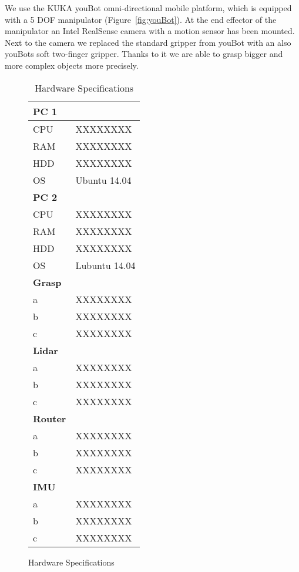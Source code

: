 We use the KUKA youBot omni-directional mobile platform, which is equipped with a 5 DOF manipulator (Figure~\ref{fig:youBot}). At the end effector of the manipulator an Intel RealSense camera with a motion sensor has been mounted. Next to the camera we replaced the standard gripper from youBot with an also youBots soft two-finger gripper. Thanks to it we are able to grasp bigger and more complex objects more precisely.

\begin{figure}[htbp]
	\begin{minipage}{0.45\textwidth}
		\caption{KUKA youBot Plattform}
		\label{fig:youBot}
	\end{minipage}
	\hfill
	\begin{minipage}{0.45\textwidth}
		\begin{table}[htbp]
			\label{tab:hw}
			\caption{Hardware Specifications}
			\centering
			\begin{tabular}{ | p{2cm} | p{3cm} | }
				\hline
				\bfseries{PC 1} &  \\
				\hline
				CPU & XXXXXXXX \\
				RAM & XXXXXXXX \\
				HDD & XXXXXXXX \\
				OS & Ubuntu 14.04 \\
				\hline \hline
				\bfseries{PC 2} &  \\
				\hline
				CPU & XXXXXXXX \\
				RAM & XXXXXXXX \\
				HDD & XXXXXXXX \\
				OS & Lubuntu 14.04 \\
				\hline \hline
				\bfseries{Grasp} &  \\
				\hline
				a & XXXXXXXX \\
				b & XXXXXXXX \\
				c & XXXXXXXX \\
				\hline \hline
				\bfseries{Lidar} &  \\
				\hline
				a & XXXXXXXX \\
				b & XXXXXXXX \\
				c & XXXXXXXX \\
				\hline \hline
				\bfseries{Router} &  \\
				\hline
				a & XXXXXXXX \\
				b & XXXXXXXX \\
				c & XXXXXXXX \\
				\hline \hline
				\bfseries{IMU} &  \\
				\hline
				a & XXXXXXXX \\
				b & XXXXXXXX \\
				c & XXXXXXXX \\
				\hline
			\end{tabular}
			\label{tab:hw}
		\end{table}
	\end{minipage}
\end{figure}


